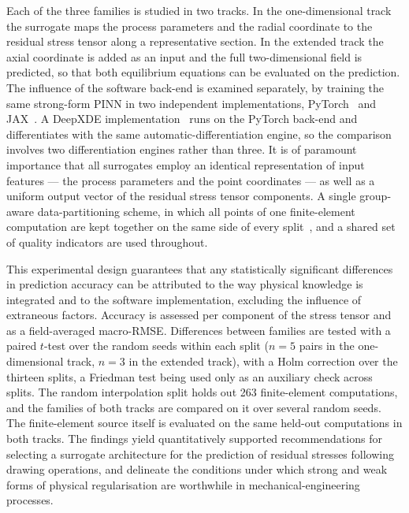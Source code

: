 \documentclass[pdflatex,sn-basic,Numbered]{sn-jnl}
\begin{document}
Each of the three families is studied in two tracks. In the one-dimensional track the surrogate maps the process parameters and the radial coordinate to the residual stress tensor along a representative section. In the extended track the axial coordinate is added as an input and the full two-dimensional field is predicted, so that both equilibrium equations can be evaluated on the prediction. The influence of the software back-end is examined separately, by training the same strong-form PINN in two independent implementations, PyTorch~\citep{paszke2019pytorch} and JAX~\citep{bradbury2018jax}. A DeepXDE implementation~\citep{lu2021} runs on the PyTorch back-end and differentiates with the same automatic-differentiation engine, so the comparison involves two differentiation engines rather than three.
It is of paramount importance that all surrogates employ an identical representation of input features --- the process parameters and the point coordinates --- as well as a uniform output vector of the residual stress tensor components. A single group-aware data-partitioning scheme, in which all points of one finite-element computation are kept together on the same side of every split~\citep{roberts2017crossvalidation}, and a shared set of quality indicators are used throughout.

This experimental design guarantees that any statistically significant differences in prediction accuracy can be attributed to the way physical knowledge is integrated and to the software implementation, excluding the influence of extraneous factors. Accuracy is assessed per component of the stress tensor and as a field-averaged macro-RMSE. Differences between families are tested with a paired $t$-test over the random seeds within each split ($n = 5$ pairs in the one-dimensional track, $n = 3$ in the extended track), with a Holm correction over the thirteen splits, a Friedman test being used only as an auxiliary check across splits. The random interpolation split holds out 263 finite-element computations, and the families of both tracks are compared on it over several random seeds. The finite-element source itself is evaluated on the same held-out computations in both tracks.
The findings yield quantitatively supported recommendations for selecting a surrogate architecture for the prediction of residual stresses following drawing operations, and delineate the conditions under which strong and weak forms of physical regularisation are worthwhile in mechanical-engineering processes.
\end{document}
